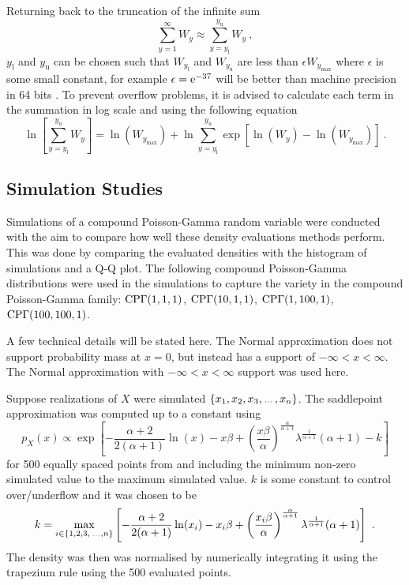 Returning back to the truncation of the infinite sum
\begin{equation}
	\sum_{y=1}^\infty W_y \approx \sum_{y=y_\text{l}}^{y_\text{u}}W_y
	\ ,
\end{equation}
$y_\text{l}$ and $y_\text{u}$ can be chosen such that $W_{y_\text{l}}$ and $W_{y_\text{u}}$ are less than $\epsilon W_{y_\text{max}}$ where $\epsilon$ is some small constant, for example $\epsilon=\mathrm{e}^{-37}$ will be better than machine precision in 64 bits \citep{dunn2005series}. To prevent overflow problems, it is advised to calculate each term in the summation in log scale \citep{dunn2005series} and using the following equation
\begin{equation}
	\ln\left[
		\sum_{y=y_\text{l}}^{y_\text{u}}W_y
	\right]
	= 
	\ln\left(
		W_{y_\text{max}}
	\right)
	+\ln\sum_{y=y_\text{l}}^{y_\text{u}}
	\exp\left[
		\ln\left(W_y\right)-\ln\left(W_{y_\text{max}}\right)
	\right]
	\ .
\end{equation}

\subsection{Simulation Studies}

Simulations of a compound Poisson-Gamma random variable were conducted with the aim to compare how well these density evaluations methods perform. This was done by comparing the evaluated densities with the histogram of simulations and a Q-Q plot. The following compound Poisson-Gamma distributions were used in the simulations to capture the variety in the compound Poisson-Gamma family: $\operatorname{CP\Gamma}(1,1,1)$, $\operatorname{CP\Gamma}(10,1,1)$, $\operatorname{CP\Gamma}(1,100,1)$, $\operatorname{CP\Gamma}(100,100,1)$.

A few technical details will be stated here. The Normal approximation does not support probability mass at $x=0$, but instead has a support of $-\infty<x<\infty$. The Normal approximation with $-\infty<x<\infty$ support was used here.

Suppose realizations of $X$ were simulated $\left\{x_1,x_2,x_3,\dotdotdot,x_n\right\}$. The saddlepoint approximation was computed up to a constant using
\begin{equation}
	p_X(x) \propto
	\exp\left[
		-\frac{\alpha+2}{2(\alpha+1)}
		\ln(x)
		-x\beta
		+\left(
		\frac{x\beta}{\alpha}
		\right)^{\frac{\alpha}{\alpha+1}}\lambda^{\frac{1}{\alpha+1}}(\alpha+1) - k
	\right]
\end{equation}
for 500 equally spaced points from and including the minimum non-zero simulated value to the maximum simulated value. $k$ is some constant to control over/underflow and it was chosen to be
\begin{equation}
	k =
	\max_{i\in\left\{1,2,3,\dotdotdot,n\right\}}
	\left[
		-\frac{\alpha+2}{2(\alpha+1)}
		\ln(x_i)
		-x_i\beta
		+\left(
			\frac{x_i\beta}{\alpha}
		\right)^{\frac{\alpha}{\alpha+1}}\lambda^{\frac{1}{\alpha+1}}(\alpha+1)
	\right]
	\ .
\end{equation}
The density was then was normalised by numerically integrating it using the trapezium rule using the 500 evaluated points.

